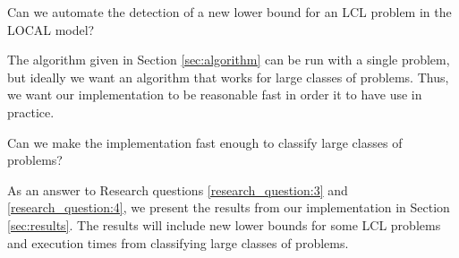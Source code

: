 \begin{researchquestion} \label{research_question:3}
Can we automate the detection of a new lower bound for an LCL problem in the LOCAL model?
\end{researchquestion}

The algorithm given in Section \ref{sec:algorithm} can be run with a single problem, but ideally we want an algorithm that works for large classes of problems.
Thus, we want our implementation to be reasonable fast in order it to have use in practice.

\begin{researchquestion} \label{research_question:4}
Can we make the implementation fast enough to classify large classes of problems?
\end{researchquestion}

As an answer to Research questions \ref{research_question:3} and \ref{research_question:4}, we present the results from our implementation in Section \ref{sec:results}.
The results will include new lower bounds for some LCL problems and execution times from classifying large classes of problems.
